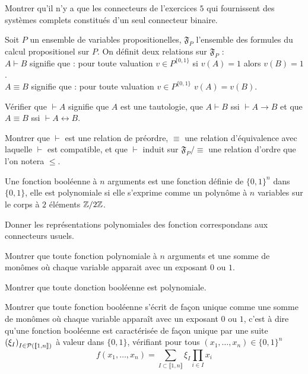 \documentclass[french]{report}
\begin{document}
\begin{exo}
    Montrer qu'il n'y a que les connecteurs de l'exercices \(5\) qui fournissent
    des systèmes complets constitués d'un seul connecteur binaire.
\end{exo}

\begin{exo}
    Soit \(P\) un ensemble de variables propositionelles, \(\mathfrak{F}_P\) l'ensemble
    des formules du calcul propositionel sur \(P\). On définit deux relations sur
    \(\mathfrak{F}_P\) :\smallskip\\
    \(A\vdash B\) signifie que : pour toute valuation \(v\in P^{\{0,1\}}\) si
    \(v(A)=1\) alors \(v(B)=1\).\\
    \(A\equiv B\) signifie que : pour toute valuation \(v\in P^{\{0,1\}}\) \(v(A)=v(B)\).
    \begin{q}{1}
        Vérifier que \(\vdash A\) signifie que \(A\) est une tautologie, que \(A\vdash B\)
        ssi \(\vdash A\rightarrow B\) et que \(A\equiv B\) ssi \(\vdash A\leftrightarrow B\).
    \end{q}
    \begin{q}{2}
        Montrer que \(\vdash\) est une relation de préordre, \(\equiv\) une relation
        d'équivalence avec laquelle \(\vdash\) est compatible, et que \(\vdash\)
        induit sur \(\mathfrak{F}_P/\equiv\) une relation d'ordre que l'on notera \(\leq\).
    \end{q} 
\end{exo}

\begin{exo}
    Une fonction booléenne à \(n\) arguments est une fonction définie de \(\{0,1\}^n\)
    dans \(\{0,1\}\), elle est polynomiale si elle s'exprime comme un polynôme à \(n\)
    variables sur le corps à \(2\) éléments \(\Z/2\Z\).
    \begin{q}{1}
        Donner les représentations polynomiales des fonction correspondans aux connecteurs usuels.
    \end{q}
    \begin{q}{2}
        Montrer que toute fonction polynomiale à \(n\) arguments et une somme de monômes
        où chaque variable apparait avec un exposant \(0\) ou \(1\).
    \end{q}
    \begin{q}{3}
        Montrer que toute donction booléenne est polynomiale.
    \end{q}
    \begin{q}{4}
        Montrer que toute fonction booléenne s'écrit de façon unique comme une somme
        de monômes où chaque variable apparaît avec un exposant \(0\) ou \(1\), c'est
        à dire qu'une fonction booléenne est caractérisée de façon unique par une suite
        \(\left(\xi_I\right)_{I\in\pow[\llbracket1,n\rrbracket]}\) à valeur dans
        \(\{0,1\}\), vérifiant pour tous \((x_1,\dots,x_n)\in \{0,1\}^n\)
        \[f(x_1,\dots,x_n)=\sum _{I\subset\llbracket1,n\rrbracket}\xi_I\prod_{i\in I}x_i\]
    \end{q}
\end{exo}
\end{document}

